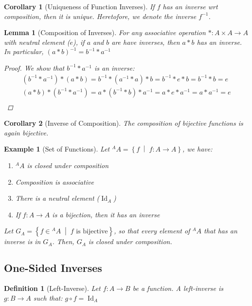 \documentclass[12pt]{article}
\newcommand{\set}[2]{\left\{{#1}\;\middle|\;{#2}\right\}}
\DeclareMathOperator{\Id}{Id}
\newtheorem{definition}{Definition}[subsection]
\newtheorem{lemma}{Lemma}[subsection]
\newtheorem{corollary}{Corollary}[subsection]
\newtheorem{example}{Example}[subsection]
\begin{document}
\begin{corollary}[Uniqueness of Function Inverses]
  If $f$ has an inverse wrt composition, then it is unique. Heretofore, we denote the inverse $f^{-1}$.
\end{corollary}

\begin{lemma}[Composition of Inverses]
  For any associative operation $*:A\times A\to A$ with neutral element ($e$), if $a$ and $b$ are have inverses, then $a*b$ has an inverse. In particular, $(a*b)^{-1}=b^{-1}*a^{-1}$
  \begin{proof}
    We show that $b^{-1}*a^{-1}$ is an inverse:
    \begin{align*}
      \left(b^{-1}*a^{-1}\right)*(a*b)=b^{-1}*\left(a^{-1}*a\right)*b=b^{-1}*e*b=b^{-1}*b=e\\
      (a*b)*\left(b^{-1}*a^{-1}\right)=a*\left(b^{-1}*b\right)*a^{-1}=a*e*a^{-1}=a*a^{-1}=e\\
    \end{align*}
  \end{proof}
\end{lemma}

\begin{corollary}[Inverse of Composition]
  The composition of bijective functions is again bijective.
\end{corollary}

\begin{example}[Set of Functions]
  Let ${}^AA=\set{f}{f: A \to A}$, we have:
  \begin{enumerate}
    \item ${}^AA$ is closed under composition
    \item Composition is associative
    \item There is a neutral element ($\Id_A$)
    \item If $f: A \to A$ is a bijection, then it has an inverse
  \end{enumerate}
  Let $G_A=\set{f\in {}^AA}{f\text{ is bijective}}$, so that every element of ${}^AA$ that has an inverse is in $G_A$. Then, $G_A$ is closed under composition.
\end{example}

\subsection{One-Sided Inverses}

\begin{definition}[Left-Inverse]
  Let $f:A\to B$ be a function. A left-inverse is $g:B\to A$ such that: $g\circ f=\Id_A$
\end{definition}
\end{document}
